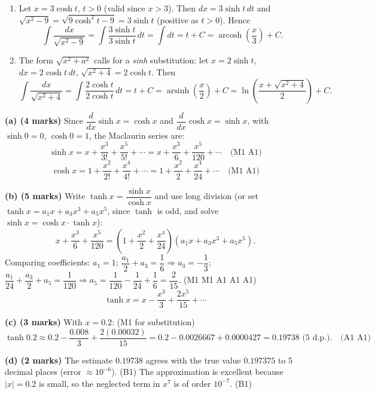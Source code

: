\documentclass[11pt]{article}
\begin{document}
\begin{corrige}
\begin{enumerate}
\item Let $x = 3\cosh t$, $t > 0$ (valid since $x > 3$). Then $dx = 3\sinh t\, dt$ and $\sqrt{x^2 - 9} = \sqrt{9\cosh^2 t - 9} = 3\sinh t$ (positive as $t > 0$). Hence
\[ \int \frac{dx}{\sqrt{x^2 - 9}} = \int \frac{3\sinh t}{3\sinh t}\, dt = \int dt = t + C = \operatorname{arcosh}\!\left(\frac{x}{3}\right) + C. \]
\item The form $\sqrt{x^2 + a^2}$ calls for a \emph{sinh} substitution: let $x = 2\sinh t$, $dx = 2\cosh t\, dt$, $\sqrt{x^2 + 4} = 2\cosh t$. Then
\[ \int \frac{dx}{\sqrt{x^2 + 4}} = \int \frac{2\cosh t}{2\cosh t}\, dt = t + C = \operatorname{arsinh}\!\left(\frac{x}{2}\right) + C = \ln\!\left(\frac{x + \sqrt{x^2+4}}{2}\right) + C. \]
\end{enumerate}
\end{corrige}

\begin{corrige}
\textbf{(a) (4 marks)} Since $\dfrac{d}{dx}\sinh x = \cosh x$ and $\dfrac{d}{dx}\cosh x = \sinh x$, with $\sinh 0 = 0$, $\cosh 0 = 1$, the Maclaurin series are:
\[ \sinh x = x + \frac{x^3}{3!} + \frac{x^5}{5!} + \cdots = x + \frac{x^3}{6} + \frac{x^5}{120} + \cdots \quad\text{(M1 A1)} \]
\[ \cosh x = 1 + \frac{x^2}{2!} + \frac{x^4}{4!} + \cdots = 1 + \frac{x^2}{2} + \frac{x^4}{24} + \cdots \quad\text{(M1 A1)} \]

\textbf{(b) (5 marks)} Write $\tanh x = \dfrac{\sinh x}{\cosh x}$ and use long division (or set $\tanh x = a_1 x + a_3 x^3 + a_5 x^5$, since $\tanh$ is odd, and solve $\sinh x = \cosh x \cdot \tanh x$):
\[ x + \frac{x^3}{6} + \frac{x^5}{120} = \left(1 + \frac{x^2}{2} + \frac{x^4}{24}\right)\left(a_1 x + a_3 x^3 + a_5 x^5\right). \]
Comparing coefficients: $a_1 = 1$; $\dfrac{a_1}{2} + a_3 = \dfrac{1}{6} \Rightarrow a_3 = -\dfrac{1}{3}$; $\dfrac{a_1}{24} + \dfrac{a_3}{2} + a_5 = \dfrac{1}{120} \Rightarrow a_5 = \dfrac{1}{120} - \dfrac{1}{24} + \dfrac{1}{6} = \dfrac{2}{15}$. (M1 M1 A1 A1 A1)
\[ \tanh x = x - \frac{x^3}{3} + \frac{2x^5}{15} + \cdots \]

\textbf{(c) (3 marks)} With $x = 0.2$: (M1 for substitution)
\[ \tanh 0.2 \approx 0.2 - \frac{0.008}{3} + \frac{2(0.00032)}{15} = 0.2 - 0.0026667 + 0.0000427 = 0.19738 \text{ (5 d.p.)}. \quad\text{(A1 A1)} \]

\textbf{(d) (2 marks)} The estimate $0.19738$ agrees with the true value $0.197375$ to 5 decimal places (error $\approx 10^{-6}$). (B1) The approximation is excellent because $|x| = 0.2$ is small, so the neglected term in $x^7$ is of order $10^{-7}$. (B1)
\end{corrige}
\end{document}
